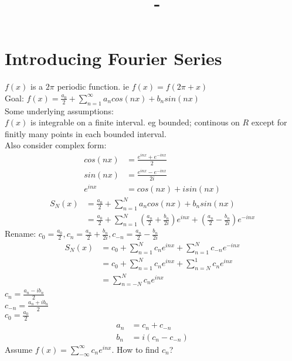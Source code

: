 \documentclass[answers,12pt,addpoints]{exam}
\author{\name}
\title{\course \ - \assignment}
\begin{document}
\maketitle

\section*{Introducing Fourier Series}
$f(x)$ is a $2\pi$ periodic function. ie $f(x) = f(2\pi + x)$\\
Goal: $f(x) = \frac{a_0}{2} + \sum_{n=1}^{\infty}a_n cos(nx) + b_n sin(nx)$\\
Some underlying assumptions:\\
$f(x)$ is integrable on a finite interval. eg bounded; continous on $R$ except for finitly many points in each bounded interval.\\
Also consider complex form: \\
\begin{align*}
    cos(nx) &= \frac{e^{inx} + e^{-inx}}{2}\\
    sin(nx) &= \frac{e^{inx} - e^{-inx}}{2i}\\
    e^{inx} &= cos(nx) + isin(nx)
\end{align*}
\begin{align*}
     S_N(x) &= \frac{a_0}{2} + \sum_{n=1}^{N}a_n cos(nx) + b_n sin(nx) \\
     &= \frac{a_0}{2} + \sum_{n=1}^{N} \left( \frac{a_n}{2} + \frac{b_n}{2i}\right) e^{inx} + \left( \frac{a_n}{2} - \frac{b_n}{2i}\right) e^{-inx}
\end{align*}
Rename: $c_0 = \frac{a_0}{2}, c_n = \frac{a_n}{2} + \frac{b_n}{2i}, c_{-n} = \frac{a_n}{2} - \frac{b_n}{2i}$\\
\begin{align*}
    S_N(x) &= c_0 + \sum_{n=1}^{N}c_n e^{inx} + \sum_{n=1}^{N}c_{-n} e^{-inx}\\
    &= c_0 + \sum_{n=1}^{N}c_n e^{inx} + \sum_{n=N}^{1}c_{n} e^{inx}\\
    &= \sum_{n=-N}^{N}c_n e^{inx}
\end{align*}
$c_n = \frac{a_n - ib_n}{2}$\\
$c_{-n} = \frac{a_n + ib_n}{2}$\\
$c_0 = \frac{a_0}{2}$\\
\begin{align*}
    a_n &= c_n + c_{-n}\\
    b_n &= i(c_n - c_{-n})
\end{align*}
Assume $f(x) = \sum_{-\infty}^{\infty} c_n e^{inx}$. How to find $c_n$?\\ 
\end{document}
